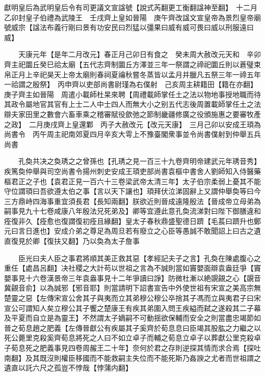 獻明皇后為武明皇后令有司更議文宣諡號【說式芮翻更工衡翻諡神至翻】　十二月乙卯封皇子伯禮為武陵王　壬戌齊上皇如晉陽　庚午齊改諡文宣皇帝為景烈皇帝廟號威宗【諡法布義行剛曰景有功安民曰烈猛以彊果曰威有威可畏曰威以刑服遠曰威】

　　天康元年【是年二月改元】春正月己卯日有食之　癸未周大赦改元天和　辛卯齊主祀圜丘癸巳祫太廟【五代志齊制圜丘方澤並三年一祭謂之禘祀圜丘則以蒼璧束帛正月上辛祀昊天上帝太廟則春祠夏禴秋嘗冬蒸皆以孟月并臘凡五祭三年一禘五年一祫謂之殷祭】　丙申齊以吏部尚書尉瑾為右僕射　己亥周主耕籍田【籍在亦翻】　庚子齊主如晉陽　周遣小載師杜杲來聘【周禮載師掌任土之法以物地事授地職而待其政令屬地官其官有上士二人中士四人而無大小之别五代志後周置載師掌任土之法辯夫家田里之數會六畜車乘之稽審賦役歛弛之節制畿疆修廣之役頒施惠之要審牧產之政】　二月庚戌齊上皇還鄴　丙子大赦改元【改元天康】　三月己卯以安成王頊為尚書令　丙午周主祀南郊夏四月辛亥大雩上不豫臺閣衆事並令尚書僕射到仲舉五兵尚書

　　孔奐共决之奐琇之之曾孫也【孔琇之見一百三十九卷齊明帝建武元年琇音秀】疾篤奐仲舉與司空尚書令揚州刺史安成王頊吏部尚書袁樞中書舍人劉師知入侍醫藥樞君正之子也【袁君正見一百六十三卷梁武帝太清三年】太子伯宗柔弱上憂其不能守位謂頊曰吾欲遵太伯之事【言以天下讓也】頊拜伏泣涕固辭上又謂仲舉奐等曰今三方鼎峙四海事重宜須長君【長知兩翻】朕欲近則晉成遠隆殷法【晉成帝立母弟為嗣事見九十七卷咸康八年殷法兄死弟及】卿等宜遵此意孔奐流涕對曰陛下御膳違和痊復非久【痊愈也復謂復初痊且緣翻】皇太子春秋鼎盛聖德日躋【毛萇曰躋升也鄭元曰言日進也】安成介弟之尊足為周旦若有廢立之心臣等愚誠不敢聞詔上曰古之遺直復見於卿【復扶又翻】乃以奐為太子詹事

　　臣光曰夫人臣之事君將順其美正救其惡【孝經記夫子之言】孔奐在陳處腹心之重任【處昌呂翻】决社稷之大計苟以世祖之言為不誠則當如竇嬰面辯袁盎廷爭【竇嬰事見十六卷漢景帝三年袁盎事見十二年爭讀曰諍】防微杜漸以絶覬覦之心【覬音冀覦音俞】以為誠邪【邪音耶】則當請明下詔書宣告中外使世祖有宋宣之美高宗無楚靈之惡【左傳宋宣公舍其子與夷而立其弟穆公穆公卒捨其子馮而立與夷君子曰宋宣公可謂知人矣立穆公其子饗之楚康王有疾其弟圍入問王疾縊而弑之遂殺其二子幕及平夏而自立是為靈王】不然謂太子嫡嗣不可動揺欲保輔而安全之則當盡忠竭節如晉之荀息趙之肥義【左傳晉獻公有疾屬其子奚齊於荀息息曰臣竭其股肱之力繼之以死公薨里克殺奚齊荀息將死之人曰不如立卓子而輔之荀息立卓子以葬獻公里克殺卓子荀息死之肥義事見四卷周赧王二十年】奈何於君之存則逆探其情而求合焉【探吐南翻】及其既沒則權臣移國而不能救嗣主失位而不能死斯乃姦諛之尤者而世祖謂之遺直以託六尺之孤豈不悖哉【悖蒲内翻】

